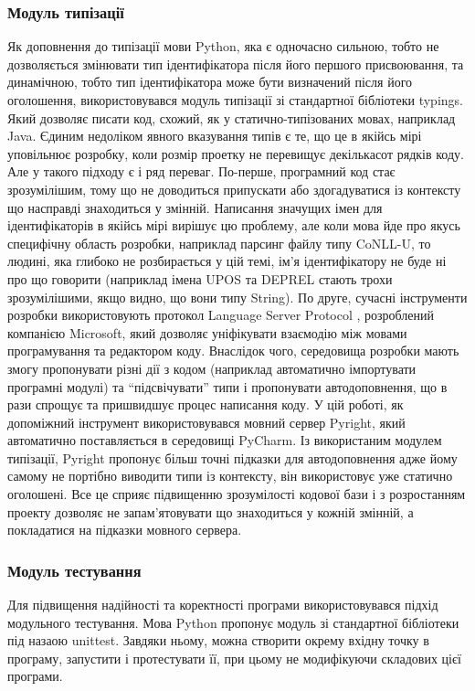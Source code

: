 \subsubsection{Модуль типізації}
Як доповнення до типізації мови Python, яка є одночасно сильною, тобто не дозволяється змінювати
тип ідентифікатора після його першого присвоювання, та динамічною, тобто тип ідентифікатора
може бути визначений після його оголошення, використовувався модуль типізації зі стандартної
бібліотеки typings. Який дозволяє писати код, схожий,
як у статично-типізованих мовах, наприклад Java.
Єдиним недоліком явного вказування типів є те, що це в якійсь мірі уповільнює розробку, коли
розмір проетку не перевищує декількасот рядків коду. Але у такого підходу є і ряд переваг.
По-перше, програмний код стає зрозумілішим, тому що не доводиться припускати або здогадуватися
із контексту що насправді знаходиться у змінній. Написання значущих імен для ідентифікаторів
в якійсь мірі вирішує цю проблему, але коли мова йде про якусь специфічну область розробки,
наприклад парсинг файлу типу CoNLL-U, то людині, яка глибоко не розбирається у цій темі,
ім'я ідентифікатору не буде ні про що говорити (наприклад імена UPOS та DEPREL стають трохи
зрозумілішими, якщо видно, що вони типу String). По друге, сучасні інструменти розробки
використовують протокол Language Server Protocol \cite{bib4}, розроблений компанією Microsoft,
який дозволяє уніфікувати взаємодію між мовами програмування та редактором коду. Внаслідок
чого, середовища розробки мають змогу пропонувати різні дії з кодом (наприклад автоматично
імпортувати програмні модулі) та ``підсвічувати'' типи і пропонувати автодоповнення, що в рази
спрощує та пришвидшує процес написання коду. У цій роботі, як допоміжний інструмент
використовувався мовний сервер Pyright, який автоматично поставляється в середовищі PyCharm.
Із використаним модулем типізації, Pyright пропонує більш точні підказки для автодоповнення
адже йому самому не портібно виводити типи із контексту, він використовує уже статично оголошені.
Все це сприяє підвищенню зрозумілості кодової бази і з розростанням проекту дозволяє не
запам'ятовувати що знаходиться у кожній змінній, а покладатися на підказки мовного сервера.

\subsubsection{Модуль тестування}
Для підвищення надійності та коректності програми використовувався підхід модульного
тестування. Мова Python пропонує модуль зі стандартної бібліотеки під назаою unittest.
Завдяки ньому, можна створити окрему вхідну точку в програму, запустити і протестувати її,
при цьому не модифікуючи складових цієї програми.

